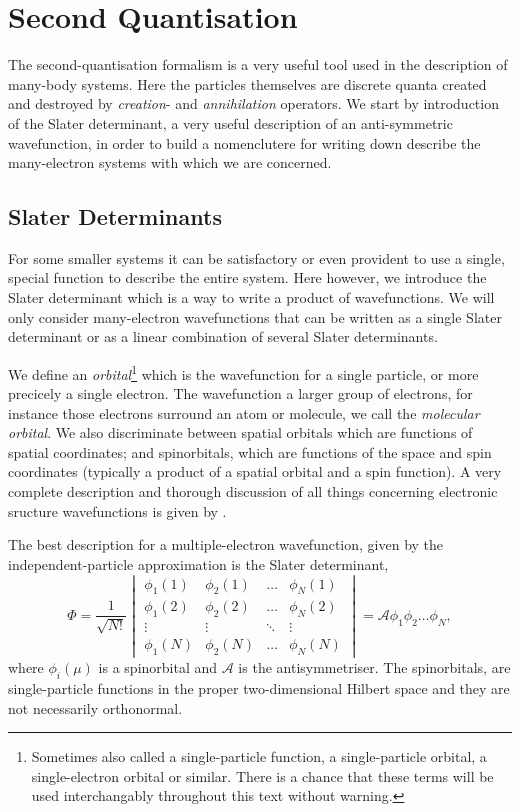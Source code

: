 \chapter{Second Quantisation}
 
The second-quantisation formalism is a very useful tool used in the description of 
many-body systems. Here the particles themselves are discrete quanta created and 
destroyed by \emph{creation}- and \emph{annihilation} operators. We start by introduction 
of the Slater determinant, a very useful description of an anti-symmetric wavefunction,
in order to build a nomenclutere for writing down describe the many-electron systems with 
which we are concerned.

\section{Slater Determinants}

For some smaller
systems it can be satisfactory or even provident to use a single, special function 
to describe the entire system. Here however, we introduce the Slater determinant which 
is a way to write a product of wavefunctions.  
We will only consider many-electron wavefunctions that can be written as a single 
Slater determinant or as a linear combination of several Slater determinants.

We define an \emph{orbital}\footnote{Sometimes also called a single-particle function,
a single-particle orbital, a single-electron orbital or similar. There is a chance that 
these terms will be used interchangably throughout this text without warning.} which is the
wavefunction for a single particle, or more precicely a single electron. The wavefunction
a larger group of electrons, for instance those electrons surround an atom or molecule,
we call the \emph{molecular orbital}. We also discriminate between 
spatial orbitals which are functions of spatial coordinates; and spinorbitals, which 
are functions of the space and spin coordinates (typically a product of a spatial orbital
and a spin function). A very complete description and thorough discussion of all things 
concerning electronic sructure wavefunctions is given 
by \citeauthor{szabo2012modern}\cite{szabo2012modern}.

The best description for a multiple-electron wavefunction, given by the independent-particle
approximation is the Slater determinant,
\begin{equation}
    \label{eq:general_slater_determinant}
    \Phi = \frac{1}{\sqrt{N!}} \begin{vmatrix}
        \phi_1(1) & \phi_2(1) & \dots & \phi_N(1) \\
        \phi_1(2) & \phi_2(2) & \dots & \phi_N(2) \\
        \vdots & \vdots & \ddots & \vdots \\
        \phi_1(N) & \phi_2(N) & \dots & \phi_N(N)
    \end{vmatrix}
    = \mathcal{A}\phi_1 \phi_2 \dots \phi_N,
\end{equation}
where $\phi_i(\mu)$ is a spinorbital and $\mathcal{A}$ is the antisymmetriser. The
spinorbitals, are single-particle functions in the proper two-dimensional 
Hilbert space and they are not necessarily orthonormal.

